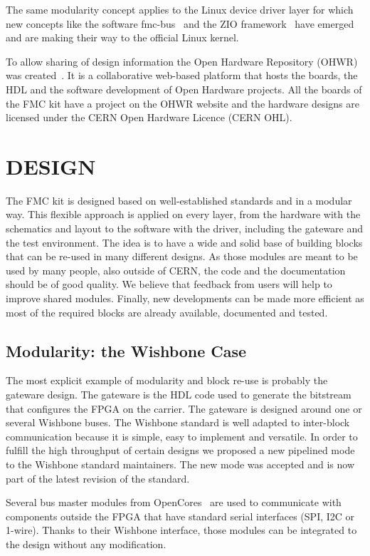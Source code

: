 \documentclass{JAC2003}
\begin{document}
The same modularity concept applies to the Linux device driver layer for which new concepts like the software fmc-bus~\cite{fmc-bus} and the ZIO framework~\cite{zio} have emerged and are making their way to the official Linux kernel.

To allow sharing of design information the Open Hardware Repository (OHWR) was created~\cite{icalepcs}.
It is a collaborative web-based platform that hosts the boards, the HDL and the software development of Open Hardware projects.
All the boards of the FMC kit have a project on the OHWR website and the hardware designs are licensed under the CERN Open Hardware Licence (CERN OHL).


\section{DESIGN}
The FMC kit is designed based on well-established standards and in a modular way.
This flexible approach is applied on every layer, from the hardware with the schematics and layout to the software with the driver, including the gateware and the test environment.
The idea is to have a wide and solid base of building blocks that can be re-used in many different designs.
As those modules are meant to be used by many people, also outside of CERN, the code and the documentation should be of good quality.
We believe that feedback from users will help to improve shared modules.
Finally, new developments can be made more efficient as most of the required blocks are already available, documented and tested.

\subsection{Modularity: the Wishbone Case}
The most explicit example of modularity and block re-use is probably the gateware design.
The gateware is the HDL code used to generate the bitstream that configures the FPGA on the carrier.
The gateware is designed around one or several Wishbone buses.
The Wishbone standard is well adapted to inter-block communication because it is simple, easy to implement and versatile.
In order to fulfill the high throughput of certain designs we proposed a new pipelined mode to the Wishbone standard maintainers. The new mode was accepted and is now part of the latest revision of the standard.

Several bus master modules from OpenCores~\cite{opencores} are used to communicate with components outside the FPGA that have standard serial interfaces (SPI, I2C or 1-wire).
Thanks to their Wishbone interface, those modules can be integrated to the design without any modification.
\end{document}
